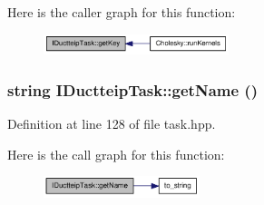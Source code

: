Here is the caller graph for this function:\nopagebreak
\begin{figure}[H]
\begin{center}
\leavevmode
\includegraphics[width=153pt]{class_i_ductteip_task_adfbcbcb284c9dba335ce519bc27d4ff1_icgraph}
\end{center}
\end{figure}
\hypertarget{class_i_ductteip_task_aff428fcafc7ce7f6aa9f281febead30a}{
\subsubsection[{getName}]{\setlength{\rightskip}{0pt plus 5cm}string IDuctteipTask::getName ()}}
\label{class_i_ductteip_task_aff428fcafc7ce7f6aa9f281febead30a}


Definition at line 128 of file task.hpp.

Here is the call graph for this function:\nopagebreak
\begin{figure}[H]
\begin{center}
\leavevmode
\includegraphics[width=129pt]{class_i_ductteip_task_aff428fcafc7ce7f6aa9f281febead30a_cgraph}
\end{center}
\end{figure}


